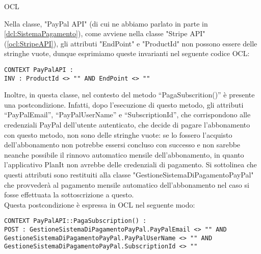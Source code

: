 \begin{listaPersonale}{OCL}
    \begin{center}
        
    \end{center}
    Nella classe, "PayPal API" (di cui ne abbiamo parlato in parte in \ref{dcl:SistemaPagamento}), come avviene nella classe "Stripe API" (\ref{ocl:StripeAPI}), gli attributi "EndPoint" e "ProductId" non possono essere delle stringhe vuote, dunque esprimiamo queste invarianti nel seguente codice OCL:
    \begin{lstlisting}
CONTEXT PayPalAPI :
INV : ProductId <> "" AND EndPoint <> ""
    \end{lstlisting}
    Inoltre, in questa classe, nel contesto del metodo “PagaSubscrition()” è presente una postcondizione. Infatti, dopo l'esecuzione di questo metodo, gli attributi “PayPalEmail”, “PayPalUserName” e “SubscriptionId”, che corrispondono alle credenziali PayPal dell'utente autenticato, che decide di pagare l'abbonamento con questo metodo, non sono delle stringhe vuote: se lo fossero l'acquisto dell'abbonamento non potrebbe essersi concluso con successo e non sarebbe neanche possibile il rinnovo automatico mensile dell'abbonamento, in quanto l'applicativo PlanIt non avrebbe delle credenziali di pagamento. Si sottolinea che questi attributi sono restituiti alla classe "GestioneSistemaDiPagamentoPayPal" che provvederà al pagamento mensile automatico dell'abbonamento nel caso si fosse effettuata la sottoscrizione a questo.\\
    Questa postcondizione è espressa in OCL nel seguente modo:
    \begin{lstlisting}
CONTEXT PayPalAPI::PagaSubscription() :
POST : GestioneSistemaDiPagamentoPayPal.PayPalEmail <> "" AND GestioneSistemaDiPagamentoPayPal.PayPalUserName <> "" AND GestioneSistemaDiPagamentoPayPal.SubscriptionId <> ""
    \end{lstlisting}






\end{listaPersonale}
